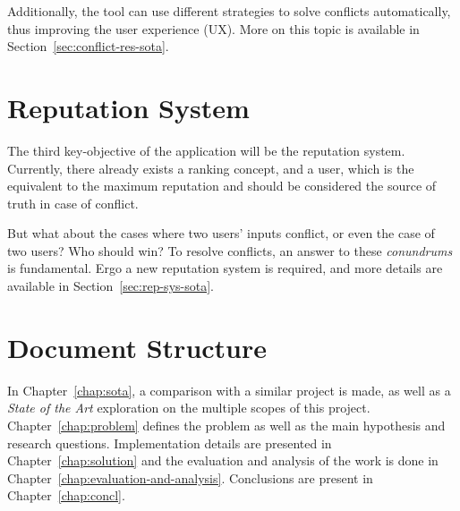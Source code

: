 Additionally, the tool can use different strategies to solve conflicts automatically, thus improving the user experience (UX). More on this topic is available in Section~\ref{sec:conflict-res-sota}.

\section{Reputation System} \label{sec:rep-sys-intro}

The third key-objective of the application will be the reputation system. Currently, there already exists a ranking concept, and a  user, which is the equivalent to the maximum reputation and should be considered the source of truth in case of conflict.

But what about the cases where two  users' inputs conflict, or even the case of two  users? Who should win? To resolve conflicts, an answer to these \textit{conundrums} is fundamental. Ergo a new reputation system is required, and more details are available in Section~\ref{sec:rep-sys-sota}.

\section{Document Structure}

In Chapter~\ref{chap:sota}, a comparison with a similar project is made, as well as a \textit{State of the Art} exploration on the multiple scopes of this project. Chapter~\ref{chap:problem} defines the problem as well as the main hypothesis and research questions. Implementation details are presented in Chapter~\ref{chap:solution} and the evaluation and analysis of the work is done in Chapter~\ref{chap:evaluation-and-analysis}. Conclusions are present in Chapter~\ref{chap:concl}. 